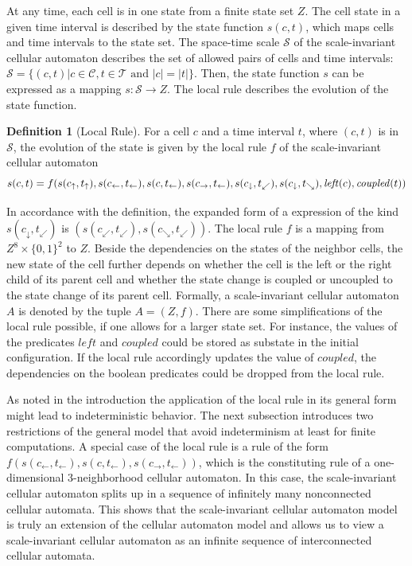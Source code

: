 \documentclass[pre,showpacs,showkeys,preprint]{revtex4}
\theoremstyle{definition}
\newtheorem{defn}{Definition}
\begin{document}
At any time, each cell is in one state from a finite state set $Z$.
The cell state in a given time interval is described by the state function $s(c,t)$,
which maps cells and time intervals to the state set.
The space-time scale $\mathcal{S}$ of the scale-invariant cellular automaton describes the set of allowed pairs of cells and time intervals:
$\mathcal{S} = \{(c,t)| c \in \mathcal{C}, t \in \mathcal{T} \mbox{ and } |c| =|t|\}$.
Then, the state function $s$ can be expressed as a mapping $s: \mathcal{S} \rightarrow Z$.
The local rule describes the evolution of the state function.
\begin{defn}[Local Rule]
For a cell $c$ and a time interval $t$, where $(c, t)$ is in $\mathcal{S}$, the
evolution of the state is given by the local rule $f$ of the scale-invariant cellular automaton
\begin{equation}
\label{eq:local-rule}
\small
s(c,t) = f(
        s(c_\uparrow, t_\uparrow),
  s(c_\leftarrow, t_\leftarrow), s(c, t_\leftarrow), s(c_\rightarrow, t_\leftarrow),
  s(c_\downarrow, t_\swarrow),  s(c_\downarrow, t_\searrow), \mathit{left}(c), \mathit{coupled}(t)
)
\end{equation}
\end{defn}
In accordance with the definition, the expanded form of a expression of the kind $s(c_\downarrow, t_\swarrow)$ is
 $(s(c_\swarrow, t_\swarrow), s(c_\searrow, t_\swarrow))$.
The local rule $f$ is a mapping from $Z^8 \times \{0,1\}^2$ to $Z$.
Beside the dependencies on the states of the neighbor cells, the new state of the cell further depends on
whether the cell is the left or the right child of its parent cell and
whether the state change is coupled or uncoupled to the state change of its parent cell.
Formally, a scale-invariant cellular automaton $A$ is denoted by the tuple $A = (Z, f)$.
There are some simplifications of the local rule possible, if one allows for a larger state set.
For instance, the values of the predicates $\mathit{left}$ and $\mathit{coupled}$ could be stored as
substate in the initial configuration.
If the local rule accordingly updates the value of $\mathit{coupled}$, the dependencies on the boolean
predicates could be dropped from the local rule.

As noted in the introduction the application of the local rule in its general form might lead to indeterministic behavior.
The next subsection introduces two restrictions of the general model that avoid indeterminism at least for finite computations.
A special case of the local rule is a rule of the form
$f(s(c_\leftarrow, t_\leftarrow), s(c, t_\leftarrow), s(c_\rightarrow, t_\leftarrow))$,
which is the constituting rule of a one-dimensional 3-neighborhood cellular automaton.
In this case, the scale-invariant cellular automaton splits up in a sequence of infinitely many nonconnected cellular automata.
This shows that the scale-invariant cellular automaton model is truly an extension of the cellular automaton model and allows us to
view a scale-invariant cellular automaton as an infinite sequence of interconnected cellular automata.
\end{document}
